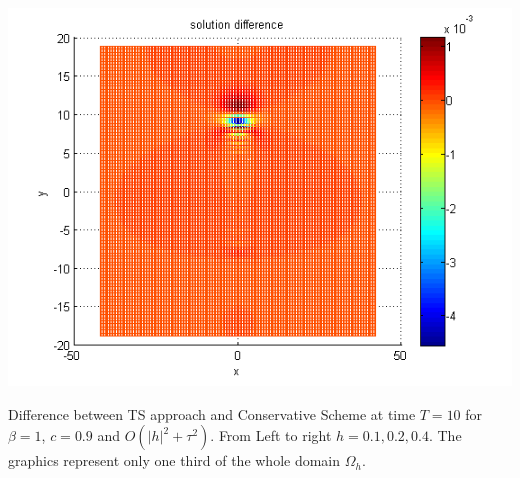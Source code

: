 \documentclass{beamer}
\begin{document}
\begin{frame}
\begin{center}
\begin{minipage}[b]{0.30\linewidth}
		 \includegraphics[width=\linewidth]{figures/compare_128_bt1_c09_h040.png}
	\end{minipage}
\end{center}
Difference between TS approach and Conservative Scheme at time $T=10$  for $\beta=1$, $c = 0.9$  and $O(|h|^2 + \tau^2)$. From Left to right $h=0.1, 0.2, 0.4$. The graphics represent only one third of the whole domain $\Omega_h$.
\end{frame}
\end{document}

